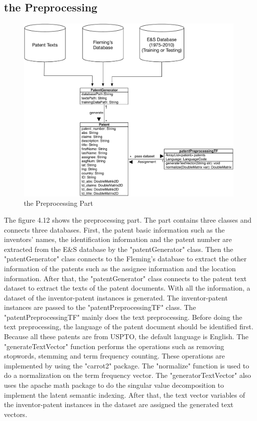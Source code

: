 \subsection{the Preprocessing}
\begin{figure}
\centering
\includegraphics[scale=0.65]{preProcessing.pdf}
\caption{the Preprocessing Part}
\end{figure}
The figure 4.12 shows the preprocessing part. The part contains three classes and connects three databases. First, the patent basic information such as the inventors' names, the identification information and the patent number are extracted from the E\&S database by the "patentGenerator" class. Then the "patentGenerator" class connects to the Fleming's database to extract the other information of the patents such as the assignee information and the location information. After that, the "patentGenerator" class connects to the patent text dataset to extract the texts of the patent documents. With all the information, a dataset of the inventor-patent instances is generated. The inventor-patent instances are passed to the "patentPreprocessingTF" class. The "patentPreprocessingTF" mainly does the text preprocessing.  Before doing the text preprocessing, the language of the patent document should be identified first. Because all these patents are from USPTO, the default language is English. The "generateTextVector" function performs the operations such as removing stopwords, stemming and term frequency counting. These operations are implemented by using the "carrot2" package. The "normalize" function is used to do a normalization on the term frequency vector. The "generatorTextVector" also uses the apache math package to do the singular value decomposition to implement the latent semantic indexing. After that, the text vector variables of the inventor-patent instances in the dataset are assigned the generated text vectors.


